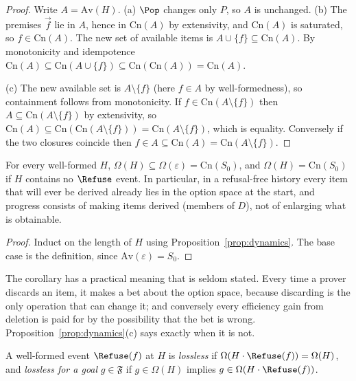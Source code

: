 \begin{proof}
Write $A=\mathrm{Av}(H)$. (a) $\Pop$ changes only $P$, so $A$ is unchanged. (b) The premises $\vec f$ lie in $A$, hence in $\mathrm{Cn}(A)$ by extensivity, and $\mathrm{Cn}(A)$ is saturated, so $f\in\mathrm{Cn}(A)$. The new set of available items is $A\cup\{f\}\subseteq\mathrm{Cn}(A)$. By monotonicity and idempotence $\mathrm{Cn}(A)\subseteq\mathrm{Cn}(A\cup\{f\})\subseteq\mathrm{Cn}(\mathrm{Cn}(A))=\mathrm{Cn}(A)$.

(c) The new available set is $A\setminus\{f\}$ (here $f\in A$ by well-formedness), so containment follows from monotonicity. If $f\in\mathrm{Cn}(A\setminus\{f\})$ then $A\subseteq\mathrm{Cn}(A\setminus\{f\})$ by extensivity, so $\mathrm{Cn}(A)\subseteq\mathrm{Cn}(\mathrm{Cn}(A\setminus\{f\}))=\mathrm{Cn}(A\setminus\{f\})$, which is equality. Conversely if the two closures coincide then $f\in A\subseteq\mathrm{Cn}(A)=\mathrm{Cn}(A\setminus\{f\})$.
\end{proof}

\begin{corollary}
\label{cor:fixed-space}
For every well-formed $H$, $\Omega(H)\subseteq\Omega(\varepsilon)=\mathrm{Cn}(S_0)$, and $\Omega(H)=\mathrm{Cn}(S_0)$ if $H$ contains no $\Refuse$ event. In particular, in a refusal-free history every item that will ever be derived already lies in the option space at the start, and progress consists of making items derived (members of $D$), not of enlarging what is obtainable.
\end{corollary}

\begin{proof}
Induct on the length of $H$ using Proposition~\ref{prop:dynamics}. The base case is the definition, since $\mathrm{Av}(\varepsilon)=S_0$.
\end{proof}

The corollary has a practical meaning that is seldom stated. Every time a prover discards an item, it makes a bet about the option space, because discarding is the only operation that can change it; and conversely every efficiency gain from deletion is paid for by the possibility that the bet is wrong. Proposition~\ref{prop:dynamics}(c) says exactly when it is not.

\begin{definition}
\label{def:lossless}
A well-formed event $\Refuse(f)$ at $H$ is \emph{lossless} if $\Omega(H\cdot\Refuse(f))=\Omega(H)$, and \emph{lossless for a goal} $g\in\mathfrak F$ if $g\in\Omega(H)$ implies $g\in\Omega(H\cdot\Refuse(f))$.
\end{definition}


